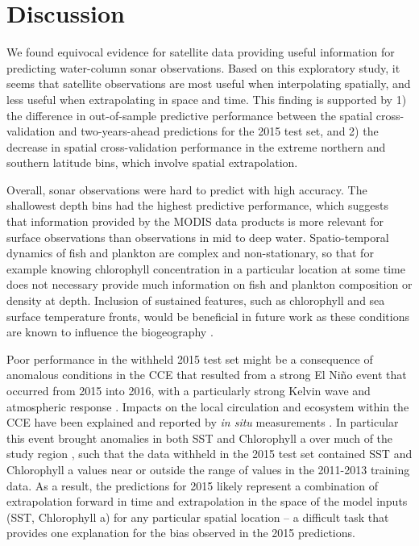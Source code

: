 \documentclass[10pt,letterpaper]{article}
\begin{document}
\section*{Discussion}
We found equivocal evidence for satellite data providing useful information for predicting water-column sonar observations. 
Based on this exploratory study, it seems that satellite observations are most useful when interpolating spatially, and less useful when extrapolating in space and time. 
This finding is supported by 1) the difference in out-of-sample predictive performance between the spatial cross-validation and two-years-ahead predictions for the 2015 test set, and 2) the decrease in spatial cross-validation performance in the extreme northern and southern latitude bins, which involve spatial extrapolation.

Overall, sonar observations were hard to predict with high accuracy.
The shallowest depth bins had the highest predictive performance, which suggests that information provided by the MODIS data products is more relevant for surface observations than observations in mid to deep water.
Spatio-temporal dynamics of fish and plankton are complex and non-stationary, so that for example knowing chlorophyll concentration in a particular location at some time does not necessary provide much information on fish and plankton composition or density at depth. 
Inclusion of sustained features, such as chlorophyll and sea surface temperature fronts, would be beneficial in future work as these conditions are known to influence the biogeography \cite{taylor2012sharp} \cite{powell2015covariability}.

Poor performance in the withheld 2015 test set might be a consequence of anomalous conditions in the CCE that resulted from a strong El Ni\~no event that occurred from 2015 into 2016, with a particularly strong Kelvin wave and atmospheric response \cite{chen2017formation, hu2017extreme}. 
Impacts on the local circulation and ecosystem within the CCE have been explained \cite{jacox2016impacts} and reported by \emph{in situ} measurements \cite{zaba2020volume}. In particular this event brought anomalies in both SST and Chlorophyll a over much of the study region \cite{jacox2016impacts}, such that the data withheld in the 2015 test set contained SST and Chlorophyll a values near or outside the range of values in the 2011-2013 training data. As a result, the predictions for 2015 likely represent a combination of extrapolation forward in time and extrapolation in the space of the model inputs (SST, Chlorophyll a) for any particular spatial location -- a difficult task that provides one explanation for the bias observed in the 2015 predictions. 
\end{document}
